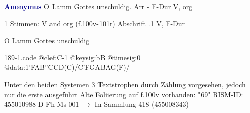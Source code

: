 \documentclass[twocolumn]{book}
\begin{document}
\newline \par \vspace{7pt} \textcolor{darkblue}{\textbf{Anonymus  }}
\newline O Lamm Gottes unschuldig. Arr - F-Dur
\newline V, org
\newline \begin{itshape}\end{itshape} 
\newline \textcolor{darkblue}{}  1 Stimmen: V and org  (f.100v-101r)
\newline Abschrift
.1  V, F-Dur
\newline \begin{footnotesize} O Lamm Gottes unschuldig \end{footnotesize}  
\begin{filecontents*}{189-1.code}
@clef:C-1
@keysig:bB
@timesig:0
@data:1'FAB''CCD(C)/C'FGABAG(F)/
\end{filecontents*}
\newline
%
\newline Unter den beiden Systemen 3 Textstrophen durch Zählung vorgesehen, jedoch nur die erste ausgeführt
\newline Alte Foliierung auf f.100v vorhanden: "69"
\newline RISM-ID: 455010988
\newline D-Fh  Ms 001
\newline $\rightarrow$ In Sammlung 418 (455008343)
      
\end{document}
